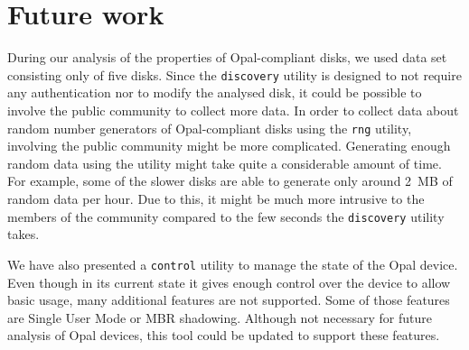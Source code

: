 

\section{Future work}


During our analysis of the properties of Opal-compliant disks, we used data set consisting only of five disks. Since the \verb|discovery| utility is designed to not require any authentication nor to modify the analysed disk, it could be possible to involve the public community to collect more data. In order to collect data about random number generators of Opal-compliant disks using the \verb|rng| utility, involving the public community might be more complicated. Generating enough random data using the utility might take quite a considerable amount of time. For example, some of the slower disks are able to generate only around 2~MB of random data per hour. Due to this, it might be much more intrusive to the members of the community compared to the few seconds the \verb|discovery| utility takes.

We have also presented a \verb|control| utility to manage the state of the Opal device. Even though in its current state it gives enough control over the device to allow basic usage, many additional features are not supported. Some of those features are Single User Mode or MBR shadowing. Although not necessary for future analysis of Opal devices, this tool could be updated to support these features.











\newpage

\setcounter{biburllcpenalty}{7000}
\setcounter{biburlucpenalty}{8000}
\printbibliography[heading=bibintoc] %



